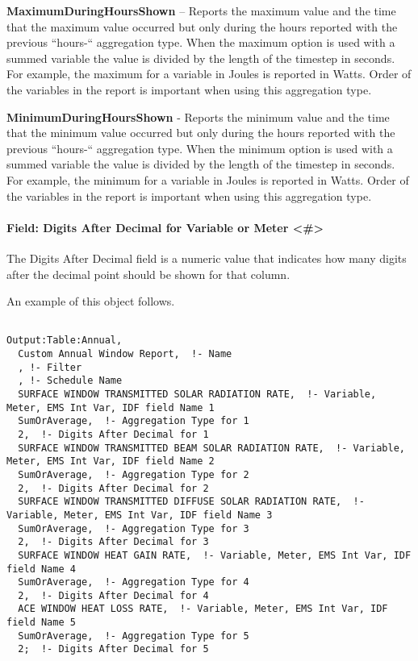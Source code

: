 \textbf{MaximumDuringHoursShown} -- Reports the maximum value and the time that the maximum value occurred but only during the hours reported with the previous ``hours-`` aggregation type. When the maximum option is used with a summed variable the value is divided by the length of the timestep in seconds. For example, the maximum for a variable in Joules is reported in Watts. Order of the variables in the report is important when using this aggregation type.

\textbf{MinimumDuringHoursShown} - Reports the minimum value and the time that the minimum value occurred but only during the hours reported with the previous ``hours-`` aggregation type. When the minimum option is used with a summed variable the value is divided by the length of the timestep in seconds. For example, the minimum for a variable in Joules is reported in Watts. Order of the variables in the report is important when using this aggregation type.

\paragraph{Field: Digits After Decimal for Variable or Meter \textless{}\#\textgreater{}}\label{field-digits-after-decimal-for-variable-or-meter}

The Digits After Decimal field is a numeric value that indicates how many digits after the decimal point should be shown for that column.

An example of this object follows.

\begin{lstlisting}

Output:Table:Annual,
  Custom Annual Window Report,  !- Name
  , !- Filter
  , !- Schedule Name
  SURFACE WINDOW TRANSMITTED SOLAR RADIATION RATE,  !- Variable, Meter, EMS Int Var, IDF field Name 1
  SumOrAverage,  !- Aggregation Type for 1
  2,  !- Digits After Decimal for 1
  SURFACE WINDOW TRANSMITTED BEAM SOLAR RADIATION RATE,  !- Variable, Meter, EMS Int Var, IDF field Name 2
  SumOrAverage,  !- Aggregation Type for 2
  2,  !- Digits After Decimal for 2
  SURFACE WINDOW TRANSMITTED DIFFUSE SOLAR RADIATION RATE,  !- Variable, Meter, EMS Int Var, IDF field Name 3
  SumOrAverage,  !- Aggregation Type for 3
  2,  !- Digits After Decimal for 3
  SURFACE WINDOW HEAT GAIN RATE,  !- Variable, Meter, EMS Int Var, IDF field Name 4
  SumOrAverage,  !- Aggregation Type for 4
  2,  !- Digits After Decimal for 4
  ACE WINDOW HEAT LOSS RATE,  !- Variable, Meter, EMS Int Var, IDF field Name 5
  SumOrAverage,  !- Aggregation Type for 5
  2;  !- Digits After Decimal for 5
\end{lstlisting}
